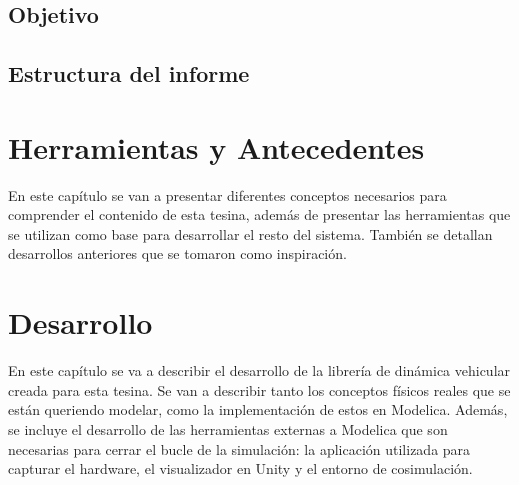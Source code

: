 \documentclass[a4paper,	11pt]{report}
\begin{document}
\section{Objetivo}
\label{sec:objective}


% 

\section{Estructura del informe}
\label{sec:struture}


\chapter{Herramientas y Antecedentes}
\label{sec:prev_concepts}
En este capítulo se van a presentar diferentes conceptos necesarios para comprender el contenido de esta tesina, además de presentar las herramientas que se utilizan como base para desarrollar el resto del sistema. También se detallan desarrollos anteriores que se tomaron como inspiración.


\chapter{Desarrollo}
\label{sec:method}
En este capítulo se va a describir el desarrollo de la librería de dinámica vehicular creada para esta tesina. Se van a describir tanto los conceptos físicos reales que se están queriendo modelar, como la implementación de estos en Modelica. Además, se incluye el desarrollo de las herramientas externas a Modelica que son necesarias para cerrar el bucle de la simulación: la aplicación utilizada para capturar el hardware, el visualizador en Unity y el entorno de cosimulación.




\end{document}
